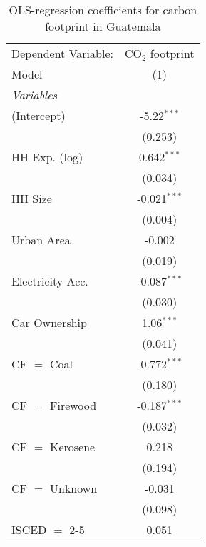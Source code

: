 
\begin{table}[htbp!]
   \centering
   \small
   \begin{adjustbox}{width = 1\textwidth, max height = 0.95\textheight, center}
      \begin{threeparttable}[b]
         \caption{\label{tab:OLS_2_GTM} OLS-regression coefficients for carbon footprint in Guatemala}
         \begin{tabular}{lc}
            \tabularnewline \midrule \midrule
            Dependent Variable: & CO$_{2}$ footprint\\  
            Model               & (1)\\  
            \midrule
            \emph{Variables}\\
            (Intercept)         & -5.22$^{***}$\\   
                                & (0.253)\\   
            HH Exp. (log)       & 0.642$^{***}$\\   
                                & (0.034)\\   
            HH Size             & -0.021$^{***}$\\   
                                & (0.004)\\   
            Urban Area          & -0.002\\   
                                & (0.019)\\   
            Electricity Acc.    & -0.087$^{***}$\\   
                                & (0.030)\\   
            Car Ownership       & 1.06$^{***}$\\   
                                & (0.041)\\   
            CF $=$ Coal         & -0.772$^{***}$\\   
                                & (0.180)\\   
            CF $=$ Firewood     & -0.187$^{***}$\\   
                                & (0.032)\\   
            CF $=$ Kerosene     & 0.218\\   
                                & (0.194)\\   
            CF $=$ Unknown      & -0.031\\   
                                & (0.098)\\   
            ISCED $=$ 2-5       & 0.051\\   

\end{tabular}
\end{threeparttable}
\end{adjustbox}
\end{table}
